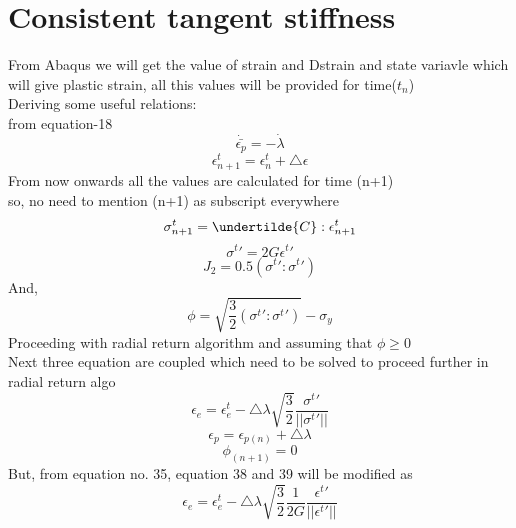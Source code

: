 \documentclass{article}
\begin{document}
\section{Consistent tangent stiffness}
From Abaqus we will get the value of strain and Dstrain and state variavle which will give plastic strain, all this values will be provided for time($t_{n}$)\\
Deriving some useful relations:\\
from equation-18
\begin{equation}
    \dot{\bar{\epsilon_{p}}}= -\dot{\lambda}
\end{equation}
\begin{equation}
    \epsilon^{t}_{n+1}= \epsilon^{t}_{n} + \bigtriangleup\epsilon
\end{equation}
From now onwards all the values are calculated for time (n+1)\\
so, no need to mention (n+1) as subscript everywhere
\begin{equation}
    \sigma^{t}_{n+1}=\undertilde{C}:\epsilon^{t}_{n+1}
\end{equation}
\begin{equation}
    \sigma^{t}\prime=2G \epsilon^{t}\prime
\end{equation}
\begin{equation}
    J_{2}=0.5(\sigma^{t}\prime:\sigma^{t}\prime)
\end{equation}
And,
\begin{equation}
    \phi = \sqrt{\frac{3}{2}(\sigma^{t}\prime:\sigma^{t}\prime)}-\sigma_{y}
\end{equation}
Proceeding with radial return algorithm and assuming that $\phi \geq 0$\\
Next three equation are coupled which need to be solved to proceed further in radial return algo\\
\begin{equation}
    \epsilon_{e}=\epsilon^{t}_{e} -\bigtriangleup\lambda \sqrt{\frac{3}{2}}\frac{\sigma^{t}\prime}{||\sigma^{t}\prime||}
\end{equation}
\begin{equation}
    \epsilon_{p}= \epsilon_{p(n)}+\bigtriangleup\lambda
\end{equation}
\begin{equation}
    \phi_{(n+1)}=0
\end{equation}
But, from equation no. 35, equation 38 and 39 will be modified as
\begin{equation}
     \epsilon_{e}=\epsilon^{t}_{e} -\bigtriangleup\lambda \sqrt{\frac{3}{2}}\frac{1}{2G}\frac{\epsilon^{t}\prime}{||\epsilon^{t}\prime||}
\end{equation}
\end{document}
